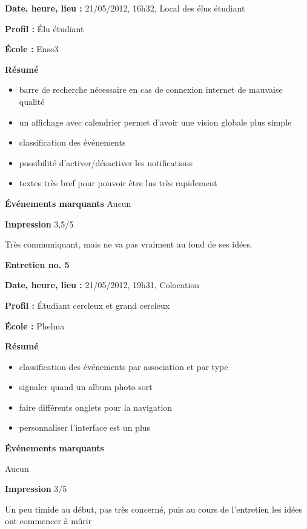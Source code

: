 \documentclass[a4paper, 11px]{article}
\begin{document}
\textbf{Date, heure, lieu : }
21/05/2012, 16h32, Local des élus étudiant

\textbf{Profil : }
Élu étudiant

\textbf{École : }
Ense3

\textbf{Résumé}
	\begin{itemize}
		\item barre de recherche nécessaire en cas de connexion internet de mauvaise qualité
		\item un affichage avec calendrier permet d'avoir une vision globale plus simple
		\item classification des événements
		\item possibilité d'activer/désactiver les notifications
		\item textes très bref pour pouvoir être lus très rapidement
	\end{itemize}
\vspace{.25cm}

\textbf{Événements marquants}
Aucun


\textbf{Impression} 3,5/5

Très communiquant, mais ne va pas vraiment au fond de ses idées.



\vspace{.3cm}

 \textbf {\large Entretien no. 5}

\textbf{Date, heure, lieu : }
21/05/2012, 19h31, Colocation

\textbf{Profil : }
Étudiant cercleux et grand cercleux


\textbf{École : }
Phelma

\textbf{Résumé}
	\begin{itemize}
		\item classification des événements par association et par type
		\item signaler quand un album photo sort
		\item faire différents onglets pour la navigation
		\item personnaliser l'interface est un plus
	\end{itemize}
\vspace{.25cm}


\textbf{Événements marquants}

Aucun

\textbf{Impression} 3/5

Un peu timide au début, pas très concerné, puis au cours de l'entretien les idées ont commencer à mûrir
\end{document}
